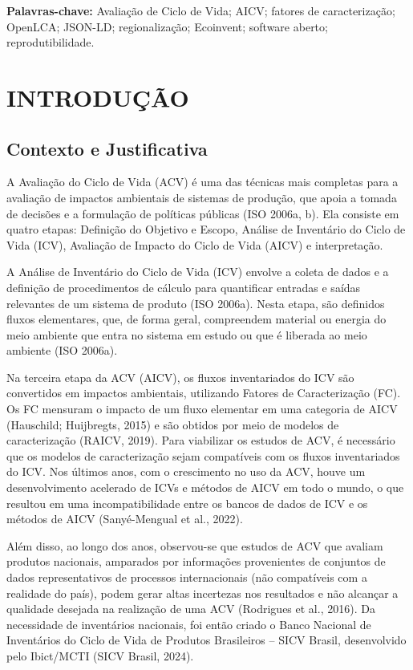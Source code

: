\textbf{Palavras-chave:} Avalia\c{c}\~ao de Ciclo de Vida; AICV; fatores de caracteriza\c{c}\~ao; OpenLCA; JSON-LD; regionaliza\c{c}\~ao; Ecoinvent; software aberto; reprodutibilidade.

\section{INTRODU\c{C}\~AO}

\subsection{Contexto e Justificativa}

A Avaliação do Ciclo de Vida (ACV) é uma das técnicas mais completas para a avaliação de impactos ambientais de sistemas de produção, que apoia a tomada de decisões e a formulação de políticas públicas (ISO 2006a, b). Ela consiste em quatro etapas: Definição do Objetivo e Escopo, Análise de Inventário do Ciclo de Vida (ICV), Avaliação de Impacto do Ciclo de Vida (AICV) e interpretação.

A Análise de Inventário do Ciclo de Vida (ICV) envolve a coleta de dados e a definição de procedimentos de cálculo para quantificar entradas e saídas relevantes de um sistema de produto (ISO 2006a). Nesta etapa, são definidos fluxos elementares, que, de forma geral, compreendem material ou energia do meio ambiente que entra no sistema em estudo ou que é liberada ao meio ambiente (ISO 2006a).

Na terceira etapa da ACV (AICV), os fluxos inventariados do ICV são convertidos em impactos ambientais, utilizando Fatores de Caracterização (FC). Os FC mensuram o impacto de um fluxo elementar em uma categoria de AICV (Hauschild; Huijbregts, 2015) e são obtidos por meio de modelos de caracterização (RAICV, 2019). Para viabilizar os estudos de ACV, é necessário que os modelos de caracterização sejam compatíveis com os fluxos inventariados do ICV.
Nos últimos anos, com o crescimento no uso da ACV, houve um desenvolvimento acelerado de ICVs e métodos de AICV em todo o mundo, o que resultou em uma incompatibilidade entre os bancos de dados de ICV e os métodos de AICV (Sanyé-Mengual et al., 2022). 

Além disso, ao longo dos anos, observou-se que estudos de ACV que avaliam produtos nacionais, amparados por informações provenientes de conjuntos de dados representativos de processos internacionais (não compatíveis com a realidade do país), podem gerar altas incertezas nos resultados e não alcançar a qualidade desejada na realização de uma ACV (Rodrigues et al., 2016). 
Da necessidade de inventários nacionais, foi então criado o Banco Nacional de Inventários do Ciclo de Vida de Produtos Brasileiros – SICV Brasil, desenvolvido pelo Ibict/MCTI (SICV Brasil, 2024).

